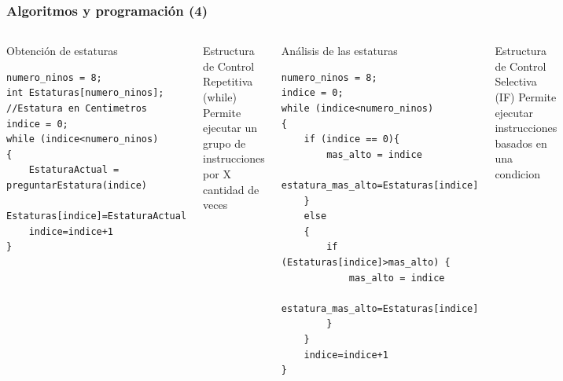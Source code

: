 \begin{frame}[fragile]
\frametitle{Algoritmos y programaci\'on (4)}
\begin{columns}
\begin{block}{Obtenci\'on de estaturas}
\begin{verbatim}
numero_ninos = 8;    
int Estaturas[numero_ninos]; //Estatura en Centimetros
indice = 0;
while (indice<numero_ninos) 
{   
    EstaturaActual = preguntarEstatura(indice)
    Estaturas[indice]=EstaturaActual
    indice=indice+1
}      
\end{verbatim} 
\pause
\end{block}

\begin{block}{Estructura de Control Repetitiva (while)}
Permite ejecutar un grupo de instrucciones por X cantidad de veces \pause
\end{block}
\begin{block}{An\'alisis de las estaturas}
\begin{verbatim}
numero_ninos = 8;
indice = 0;
while (indice<numero_ninos) 
{   
    if (indice == 0){        
        mas_alto = indice  
        estatura_mas_alto=Estaturas[indice]     
    } 
    else 
    {
        if (Estaturas[indice]>mas_alto) {
            mas_alto = indice
            estatura_mas_alto=Estaturas[indice]     
        }
    }
    indice=indice+1
}      
\end{verbatim} 
\pause
\end{block}

\begin{block}{Estructura de Control Selectiva (IF)}
Permite ejecutar instrucciones basados en una condicion \pause
\end{block}

\end{columns}




\end{frame}


